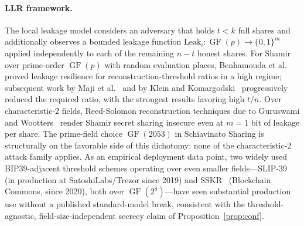\documentclass[11pt]{article}
\newcommand{\GF}{\operatorname{GF}}
\begin{document}
\paragraph{LLR framework.} The local leakage model considers an adversary that holds $t < k$ full shares and additionally observes a bounded leakage function $\mathrm{Leak}_i : \GF(p) \to \{0,1\}^m$ applied independently to each of the remaining $n - t$ honest shares. For Shamir over prime-order $\GF(p)$ with random evaluation places, Benhamouda et al.~\cite{benhamouda2018} proved leakage resilience for reconstruction-threshold ratios in a high regime; subsequent work by Maji et al.~\cite{maji2021,maji2025} and by Klein and Komargodski~\cite{klein2023} progressively reduced the required ratio, with the strongest results favoring high $t/n$. Over characteristic-2 fields, Reed-Solomon reconstruction techniques due to Guruswami and Wootters~\cite{guruswamiwootters2016} render Shamir secret sharing insecure even at $m = 1$ bit of leakage per share. The prime-field choice $\GF(2053)$ in Schiavinato Sharing is structurally on the favorable side of this dichotomy: none of the characteristic-2 attack family applies. As an empirical deployment data point, two widely used BIP39-adjacent threshold schemes operating over even smaller fields---SLIP-39~\cite{slip39} (in production at SatoshiLabs/Trezor since 2019) and SSKR~\cite{sskr} (Blockchain Commons, since 2020), both over $\GF(2^8)$---have seen substantial production use without a published standard-model break, consistent with the threshold-agnostic, field-size-independent secrecy claim of Proposition~\ref{prop:conf}.
\end{document}
